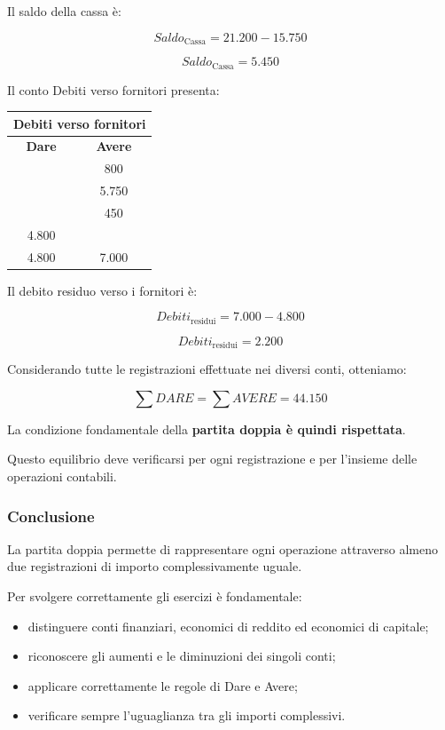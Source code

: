 \noindent Il saldo della cassa è:

\[
Saldo_{\text{Cassa}}
=21.200-15.750
\]

\[
\boxed{Saldo_{\text{Cassa}}=5.450}
\]

\noindent Il conto Debiti verso fornitori presenta:

\begin{center}
\begin{tabular}{c|c}
\multicolumn{2}{c}{\textbf{Debiti verso fornitori}} \\
\hline
\textbf{Dare} & \textbf{Avere} \\
\hline
& 800 \\
& 5.750 \\
& 450 \\
4.800 & \\
\hline
4.800 & 7.000 \\
\end{tabular}
\end{center}

\noindent Il debito residuo verso i fornitori è:

\[
Debiti_{\text{residui}}
=7.000-4.800
\]

\[
\boxed{Debiti_{\text{residui}}=2.200}
\]

\noindent Considerando tutte le registrazioni
effettuate nei diversi conti, otteniamo:

\[
\boxed{
\sum DARE=\sum AVERE=44.150
}
\]

\noindent La condizione fondamentale della
\textbf{partita doppia è quindi rispettata}.

\medskip

\noindent Questo equilibrio deve verificarsi
per ogni registrazione e per l'insieme
delle operazioni contabili.


\subsubsection*{Conclusione}

\noindent La partita doppia permette di rappresentare
ogni operazione attraverso almeno due registrazioni
di importo complessivamente uguale.

\medskip

\noindent Per svolgere correttamente gli esercizi
è fondamentale:

\begin{itemize}
    \item distinguere conti finanziari,
    economici di reddito ed economici di capitale;

    \item riconoscere gli aumenti e le diminuzioni
    dei singoli conti;

    \item applicare correttamente le regole
    di Dare e Avere;

    \item verificare sempre l'uguaglianza
    tra gli importi complessivi.
\end{itemize}

